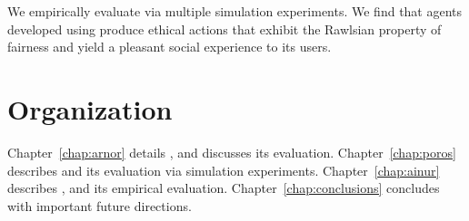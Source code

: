  
We empirically evaluate \frameworkAinur via multiple simulation 
experiments. We find that agents developed using \frameworkAinur produce ethical actions that exhibit the
Rawlsian property of fairness and yield a pleasant social experience to its users.

\section{Organization}
Chapter~\ref{chap:arnor} details \frameworkA, and discusses its evaluation. 
Chapter~\ref{chap:poros} describes \frameworkB and its 
evaluation via simulation experiments. 
Chapter~\ref{chap:ainur} describes \frameworkAinur, and its empirical evaluation.  
Chapter~\ref{chap:conclusions} concludes with important future directions.